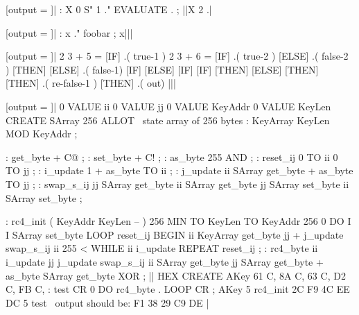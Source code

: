 [output = \result]|
  : X 0 S" 1 ." EVALUATE . ;
||X 2 .|
\typeout{\result}

[output = \result]|
  : x ." foobar
  ; x|||
\typeout{\result}

[output = \result]|
  2 3 + 5 =
  [IF]
    .( true-1 )
    2 3 + 6 =
    [IF] .( true-2 ) [ELSE] .( false-2 ) [THEN]
  [ELSE]
    .( false-1)
    [IF] [ELSE] [IF] [IF] [THEN] [ELSE] [THEN] [THEN]
    .( re-false-1 )
  [THEN]
  .( out)
|||
\typeout{\result}

[output = \result]|
  0 VALUE ii        0 VALUE jj
  0 VALUE KeyAddr   0 VALUE KeyLen
  CREATE SArray   256 ALLOT   \ state array of 256 bytes
  : KeyArray      KeyLen MOD   KeyAddr ;

  : get_byte      + C@ ;
  : set_byte      + C! ;
  : as_byte       255 AND ;
  : reset_ij      0 TO ii   0 TO jj ;
  : i_update      1 +   as_byte TO ii ;
  : j_update      ii SArray get_byte +   as_byte TO jj ;
  : swap_s_ij
      jj SArray get_byte
         ii SArray get_byte  jj SArray set_byte
      ii SArray set_byte
  ;

  : rc4_init ( KeyAddr KeyLen -- )
      256 MIN TO KeyLen   TO KeyAddr
      256 0 DO   I I SArray set_byte   LOOP
      reset_ij
      BEGIN
          ii KeyArray get_byte   jj +  j_update
          swap_s_ij
          ii 255 < WHILE
          ii i_update
      REPEAT
      reset_ij
  ;
  : rc4_byte
      ii i_update   jj j_update
      swap_s_ij
      ii SArray get_byte   jj SArray get_byte +   as_byte SArray get_byte  XOR
  ;
||
  HEX
  CREATE AKey   61 C, 8A C, 63 C, D2 C, FB C,
  : test   CR   0 DO  rc4_byte . LOOP  CR ;
  AKey 5 rc4_init
  2C F9 4C EE DC  5 test   \ output should be: F1 38 29 C9 DE
|
\typeout{\result}

\stop
